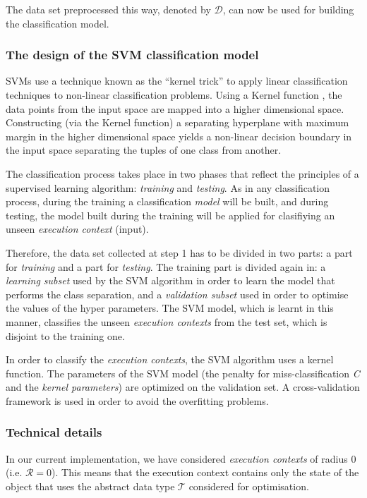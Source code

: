 The data set preprocessed this way, denoted by $\mathcal{D}$, can now be used for building the classification model.

\subsubsection{The design of the SVM classification model}

SVMs use a technique known as the ``kernel trick'' to apply linear classification
techniques to non-linear classification problems. Using a Kernel function \cite{vapnik}, the data points from the input space are mapped into a higher dimensional space. Constructing (via the Kernel function) a separating hyperplane with maximum margin in the higher dimensional space yields a non-linear decision boundary in the input space separating the tuples of one class
from another.

The classification process takes place in two phases that reflect the principles of a supervised learning algorithm: \emph{training} and \emph{testing}. As in any classification process, during the training a classification \emph{model} will be built, and during testing, the model built during the training will be applied for clasifiying an unseen \emph{execution context} (input).

Therefore, the data set collected at step 1 has to be divided in two
parts: a part for \emph{training} and a part for \emph{testing}. The training part is divided
again in: a \emph{learning subset} used by the SVM algorithm in order to learn the
model that performs the class separation, and a \emph{validation subset} used in
order to optimise the values of the hyper parameters. The SVM model, which
is learnt in this manner, classifies the unseen \emph{execution contexts} from
the test set, which is disjoint to the training one.

In order to classify the \emph{execution contexts}, the SVM algorithm uses a kernel function. The parameters of the SVM
model (the penalty for miss-classification \emph{C} and the \emph{kernel parameters}) are
optimized on the validation set. A cross-validation framework is used in
order to avoid the overfitting problems. 

\subsubsection{Technical details}

In our current implementation, we have considered \emph{execution contexts} of radius $0$ (i.e. $\mathcal{R}=0$). This means that the execution context contains only the state of the object that uses the abstract data type $\mathcal{T}$ considered for optimisation.

